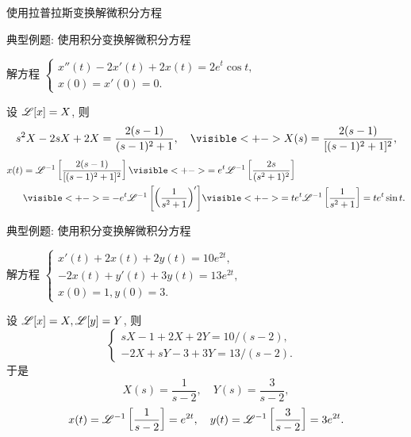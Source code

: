 \begin{frame}{使用拉普拉斯变换解微积分方程}
\begin{center}
\end{center}
\end{frame}


\begin{frame}{典型例题: 使用积分变换解微积分方程}
\beqskip{8pt}
\begin{example}
解方程 
  $\begin{cases}
    x''(t)-2x'(t)+2x(t)=2e^t\cos t,& \\
    x(0)=x'(0)=0.&
  \end{cases}$
\end{example}
\begin{solution}
设 $\mathscr{L}[x]=X$, 则
\[s^2X-2sX+2X=\frac{2(s-1)}{(s-1)^2+1},\quad
\visible<+->{X(s)=\frac{2(s-1)}{[(s-1)^2+1]^2},}\]
\onslide<+->
\vspace{-\baselineskip}
\begin{align*}
x(t)&=\msl^{-1}\left[\frac{2(s-1)}{[(s-1)^2+1]^2}\right]
\visible<+->{=e^t\msl^{-1}\left[\frac{2s}{(s^2+1)^2}\right]}\\
&\visible<+->{=-e^t\msl^{-1}\left[\left(\frac1{s^2+1}\right)'\right]}
\visible<+->{=te^t\msl^{-1}\left[\frac1{s^2+1}\right]=te^t\sin t.}
\end{align*}
\end{solution}
\endgroup
\end{frame}


\begin{frame}{典型例题: 使用积分变换解微积分方程}
\beqskip{0pt}
\begin{example}
解方程 
  $\begin{cases}
    x'(t)+2x(t)+2y(t)=10e^{2t},& \\
    -2x(t)+y'(t)+3y(t)=13e^{2t},& \\
    x(0)=1,y(0)=3.&
  \end{cases}$
\end{example}
\vspace{-7pt}
\begin{solution}
设 $\mathscr{L}[x]=X,\mathscr{L}[y]=Y$, 则
  \[\begin{cases}
    sX-1+2X+2Y=10/(s-2),& \\
    -2X+sY-3+3Y=13/(s-2).&
  \end{cases}\]
\onslide<+->
于是
\[X(s)=\frac1{s-2},\quad Y(s)=\frac3{s-2},\]
\onslide<+->
\[x(t)=\mathscr{L}^{-1}\left[\frac1{s-2}\right]=e^{2t},\quad
y(t)=\mathscr{L}^{-1}\left[\frac3{s-2}\right]=3e^{2t}.\]
\end{solution}
\endgroup
\end{frame}


